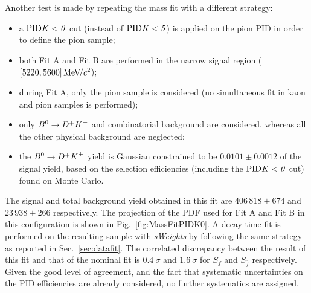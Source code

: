 Another test is made by repeating the mass fit with a different strategy:
\begin{itemize}[noitemsep,topsep=0pt]
  \item a $\rm{PID}\it{K}<0$ cut (instead of $\rm{PID}\it{K}<5$) is applied on the pion PID in order to define the pion sample;
  \item both Fit A and Fit B are performed in the narrow signal region ($[5220,5600]{\mathrm{\,Me\kern -0.1em V\!/}c^2}$);
  \item during Fit A, only the pion sample is considered (no simultaneous fit in kaon and pion samples is performed);
  \item only $B^0\rightarrow D^\mp K^\pm$ and combinatorial background are considered, whereas all the other physical background are neglected;
  \item the $B^0\rightarrow D^\mp K^\pm$ yield is Gaussian constrained to be $0.0101\pm0.0012$ of the signal yield, based on the selection efficiencies 
    (including the $\rm{PID}\it{K}<0$ cut) found on Monte Carlo.
\end{itemize}
The signal and total background yield obtained in this fit are $406\,818\pm674$ and $23\,938\pm266$ respectively.
The projection of the PDF used for Fit A and Fit B in this configuration is shown in Fig.~\ref{fig:MassFitPIDK0}. 
A decay time fit is performed on the resulting sample with \emph{sWeights}
by following the same strategy as reported in Sec.~\ref{sec:datafit}. The correlated discrepancy between the result of this fit and that of the nominal fit is $0.4~\sigma$
and $1.6~\sigma$ for $S_f$ and $S_{\bar f}$ respectively. Given the good level of agreement, and the fact that systematic uncertainties on the PID efficiencies are already considered, no further systematics are assigned.

